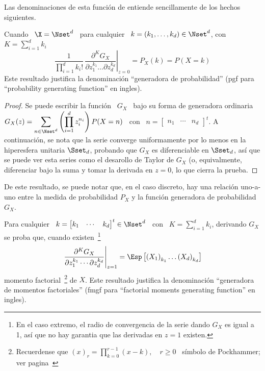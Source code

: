 Las denominaciones  de esta  funci\'on de entiende  sencillamente de  los hechos
siguientes.
%
\begin{lema}
  Cuando \  $\X =  \Nset^d$ \ para  cualquier \ $k  = (k_1  , \ldots ,  k_d) \in
  \Nset^d$, con $K = \sum_{i=1}^d k_i$
  \[
  \frac1{\prod_{i=1}^d  k_i!} \, \left.\frac{\partial^K  G_X}{\partial z_1^{k_1}
      \ldots \partial z_d^{k_d}}\right|_{z=0} = P_X(k) = P(X = k)
  \]
  Este resultado justifica la denominaci\'on ``generadora de probabilidad'' (pgf
  para ``probability generating function'' en ingles).
\end{lema}
%
\begin{proof}
  Se puede escribir la funci\'on \ $G_X$ \ bajo su forma de generadora ordinaria
  \ $\displaystyle G_X(z) =  \sum_{n \in \Nset^d} \left( \prod_{i=1}^d z_i^{n_i}
  \right)  P(X   =  n)$  \   con  \  $n   =  \begin{bmatrix}  n_1  &   \cdots  &
    n_d  \end{bmatrix}^t$.  A continuaci\'on,  se  nota  que  la serie  converge
  uniformamente por lo menos en  la hiperesfera unitaria $\Sset_d$, probando que
  $G_X$ es diferenciable  en $\Sset_d$, as\'i que se puede  ver esta series como
  el desarollo de  Taylor de $G_X$ (o, equivalmente, diferenciar  bajo la suma y
  tomar la derivada en $z = 0$, lo que cierra la prueba.
\end{proof}

De este resultado,  se puede notar que, en el caso  discreto, hay una relaci\'on
uno-a-uno entre  la medida  de probabilidad $P_X$  y la funci\'on  generadora de
probabilidad $G_X$.


\begin{lema}
  Para cualquier \  $k = \begin{bmatrix} k_1 & \cdots  & k_d \end{bmatrix}^t \in
  \Nset^d$ \ con \ $K =  \sum_{i=1}^d k_i$, derivando $G_X$ se proba que, cuando
  existen~\footnote{En el  caso extremo,  el radio de  convergencia de  la serie
    dando $G_X$ es igual a 1, as\'i  que no hay garantia que las derivadas en $z
    = 1$ existen.}
  \[
  \left.\frac{\partial^K     G_X}{\partial     z_1^{k_1}     \cdots     \partial
      z_d^{k_d}}\right|_{z=1}  =  \Esp\left[  \left(  X_1  \right)_{k_1}  \ldots
    \left( X_d \right)_{k_d} \right]
  \]
  momento factorial~\footnote{Recuerdense que  $(x)_r = \prod_{k=0}^{r-1} (x-k),
    \quad     r     \ge     0$     \    s\'imbolo     de     Pockhammer;     ver
    pagina~\pageref{MP:Pockhammer}}  de   $X$.   Este  resultado   justifica  la
  denominaci\'on ``generadora  de momentos factoriales''  (fmgf para ``factorial
  moments generating function'' en ingles).
\end{lema}

